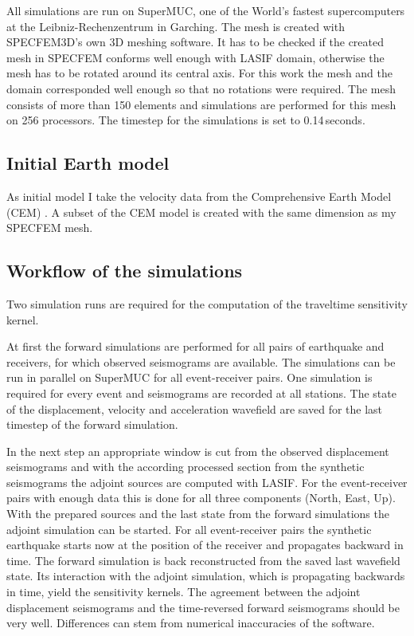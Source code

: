 All simulations are run on SuperMUC, one of the World's fastest supercomputers at the Leibniz-Rechenzentrum in Garching. 
The mesh is created with SPECFEM3D's own 3D meshing software. 
It has to be checked if the created mesh in SPECFEM conforms well enough with LASIF domain, otherwise the mesh has to 
be rotated around its central axis.
For this work the mesh and the domain corresponded well enough so that no rotations were required.
The mesh consists of more than 150 %
elements and simulations are performed for this mesh on 256 processors.
The timestep for the simulations is set to 0.14$\,$seconds.  


\subsection{Initial Earth model}

As initial model I take the velocity data from the Comprehensive Earth Model (CEM) \citep{Afanasiev2014}.
A subset of the CEM model is created with the same dimension as my SPECFEM mesh. 


\subsection{Workflow of the simulations}

Two simulation runs are required for the computation of the traveltime sensitivity kernel.

At first the forward simulations are performed for all pairs of earthquake and receivers, for which observed seismograms are available.
The simulations can be run in parallel on SuperMUC for all event-receiver pairs. 
One simulation is required for every event and seismograms are recorded at all stations. %
The state of the displacement, velocity and acceleration wavefield are saved for the last timestep of the forward simulation.

In the next step an appropriate window %
is cut from the observed displacement seismograms and with the according processed section from the synthetic seismograms 
the adjoint sources are computed with LASIF.
For the event-receiver pairs with enough data this is done for all three components (North, East, Up).
With the prepared sources and the last state from the forward simulations the adjoint simulation can be started.
For all event-receiver pairs the synthetic earthquake starts now at the position of the receiver and propagates
backward in time.  
The forward simulation is back reconstructed from the saved last wavefield state. 
Its interaction with the adjoint simulation, which is propagating backwards in time,
yield the sensitivity kernels. %
The agreement between the adjoint displacement seismograms and the time-reversed forward seismograms should be very well.
Differences can stem from numerical inaccuracies of the software. %









